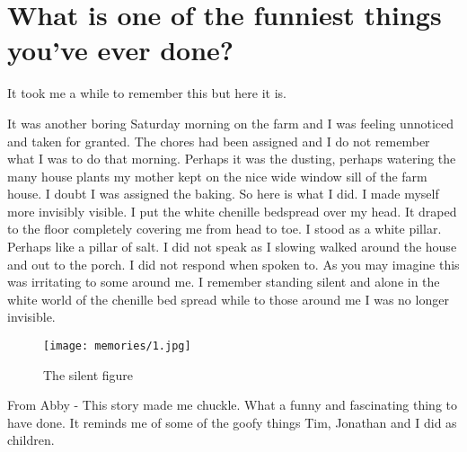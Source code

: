 \section{What is one of the funniest things you've ever done?}
It took me a while to remember this but here it is.

It was another boring Saturday morning on the farm and I was feeling unnoticed and taken for granted.
The chores had been assigned and I do not remember what I was to do that morning.
Perhaps it was the dusting, perhaps watering the many house plants my mother kept on the nice wide window sill of the farm house.
I doubt I was assigned the baking.
So here is what I did.
I made myself more invisibly visible.
I put the white chenille bedspread over my head.
It draped to the floor completely covering me from head to toe.
I stood as a white pillar.
Perhaps like a pillar of salt.
I did not speak as I slowing walked around the house and out to the porch.
I did not respond when spoken to.
As you may imagine this was irritating to some around me.
I remember standing silent and alone in the white world of the chenille bed spread while to those around me I was no longer invisible.

\begin{figure}
\centering
\texttt{[image: memories/1.jpg]}
\caption{
The silent figure
}
\end{figure}

From Abby - This story made me chuckle.
What a funny and fascinating thing to have done.
It reminds me of some of the goofy things Tim, Jonathan and I did as children.





